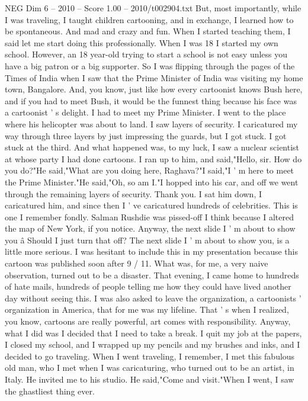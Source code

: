 \begin{textsample}{NEG Dim 6 – 2010 – Score 1.00 – 2010/t002904.txt}
But, most importantly, while I was traveling, I taught children cartooning, and in exchange, I learned how to be spontaneous.
And mad and crazy and fun.
When I started teaching them, I said let me start doing this professionally.
When I was 18 I started my own school.
However, an 18 year-old trying to start a school is not easy unless you have a big patron or a big supporter.
So I was flipping through the pages of the Times of India when I saw that the Prime Minister of India was visiting my home town, Bangalore.
And, you know, just like how every cartoonist knows Bush here, and if you had to meet Bush, it would be the funnest thing because his face was a cartoonist ' s delight.
I had to meet my Prime Minister.
I went to the place where his helicopter was about to land.
I saw layers of security.
I caricatured my way through three layers by just impressing the guards, but I got stuck.
I got stuck at the third.
And what happened was, to my luck, I saw a nuclear scientist at whose party I had done cartoons.
I ran up to him, and said,"Hello, sir.
How do you do?"He said,"What are you doing here, Raghava?"I said,"I ' m here to meet the Prime Minister."He said,"Oh, so am I."I hopped into his car, and off we went through the remaining layers of security.
Thank you.
I sat him down, I caricatured him, and since then I ' ve caricatured hundreds of celebrities.
This is one I remember fondly.
Salman Rushdie was pissed-off I think because I altered the map of New York, if you notice.
Anyway, the next slide I ' m about to show you â Should I just turn that off?
The next slide I ' m about to show you, is a little more serious.
I was hesitant to include this in my presentation because this cartoon was published soon after 9 / 11.
What was, for me, a very naive observation, turned out to be a disaster.
That evening, I came home to hundreds of hate mails, hundreds of people telling me how they could have lived another day without seeing this.
I was also asked to leave the organization, a cartoonists ' organization in America, that for me was my lifeline.
That ' s when I realized, you know, cartoons are really powerful, art comes with responsibility.
Anyway, what I did was I decided that I need to take a break.
I quit my job at the papers, I closed my school, and I wrapped up my pencils and my brushes and inks, and I decided to go traveling.
When I went traveling, I remember, I met this fabulous old man, who I met when I was caricaturing, who turned out to be an artist, in Italy.
He invited me to his studio.
He said,"Come and visit."When I went, I saw the ghastliest thing ever.

\end{textsample}
